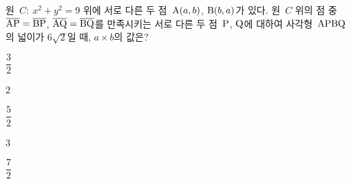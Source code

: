 원~$C:\ x^2+y^2=9$ 위에 서로 다른 두 점~$\mathrm{A}(a{,}\mkern3mu b)$, $\mathrm{B}(b{,}\mkern3mu a)$가 있다. 원~$C$ 위의 점 중 $\overline{\mathrm{AP}}=\overline{\mathrm{BP}}$, $\overline{\mathrm{AQ}}=\overline{\mathrm{BQ}}$를 만족시키는 서로 다른 두 점~$\mathrm{P}$, $\mathrm{Q}$에 대하여 사각형~$\mathrm{APBQ}$의 넓이가 $6\sqrt{2}$일 때, $a\times b$의 값은?
\begin{choices32}{\rule[-3ex]{0pt}{8ex}$\dfrac{3}{2}$}{\rule[-3ex]{0pt}{8ex}$2$}{\rule[-3ex]{0pt}{8ex}$\dfrac{5}{2}$}{\rule[-3ex]{0pt}{8ex}$3$}{\rule[-3ex]{0pt}{8ex}$\dfrac{7}{2}$}\end{choices32}
